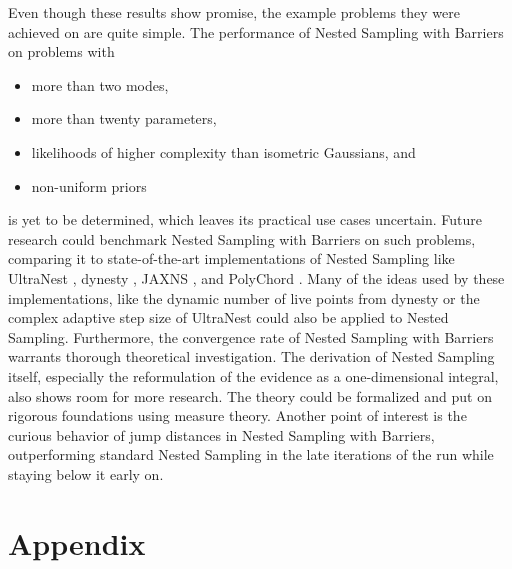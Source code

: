 \documentclass[12pt, a4paper]{report}
\begin{document}
Even though these results show promise, the example problems they were achieved on are quite simple.
The performance of Nested Sampling with Barriers on problems with
\begin{itemize}
    \item more than two modes,
    \item more than twenty parameters,
    \item likelihoods of higher complexity than isometric Gaussians, and
    \item non-uniform priors
\end{itemize}
is yet to be determined, which leaves its practical use cases uncertain.
Future research could benchmark Nested Sampling with Barriers on such problems, comparing it to state-of-the-art implementations of Nested Sampling like UltraNest \cite{ultranest}, dynesty \cite{dynesty}, JAXNS \cite{jaxns}, and PolyChord \cite{polychord}.
Many of the ideas used by these implementations, like the dynamic number of live points from dynesty or the complex adaptive step size of UltraNest could also be applied to Nested Sampling.
Furthermore, the convergence rate of Nested Sampling with Barriers warrants thorough theoretical investigation.
The derivation of Nested Sampling itself, especially the reformulation of the evidence as a one-dimensional integral, also shows room for more research.
The theory could be formalized and put on rigorous foundations using measure theory.
Another point of interest is the curious behavior of jump distances in Nested Sampling with Barriers, outperforming standard Nested Sampling in the late iterations of the run while staying below it early on.

\clearpage
{}
\printbibliography


\clearpage
\chapter*{Appendix}
\end{document}

